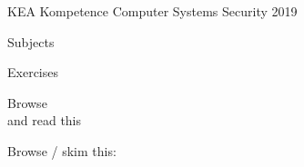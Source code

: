 \documentclass[Screen16to9,17pt]{foils}
\begin{document}
\mytitlepage
{}
{KEA Kompetence Computer Systems Security 2019}



\begin{list1}
\item Subjects
\begin{list2}
\item
\item
\item
\end{list2}
\item Exercises
\begin{list2}
\item
\item
\end{list2}
\end{list1}




\begin{list1}
\item Browse\\

and read this\\

\item Browse / skim this:\\

\end{list1}




\slidenext
\end{document}
